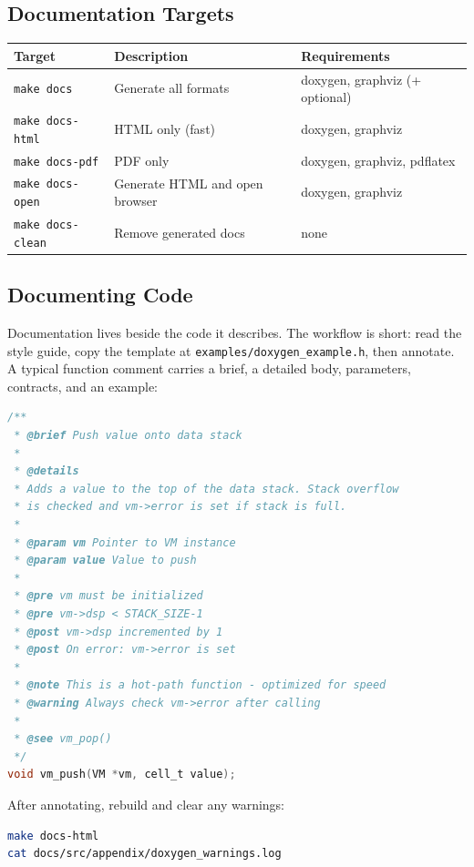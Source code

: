 \subsection{Documentation Targets}

\begin{tabular}{lll}
\toprule
Target & Description & Requirements \\
\midrule
\texttt{make docs} & Generate all formats & doxygen, graphviz (+ optional) \\
\texttt{make docs-html} & HTML only (fast) & doxygen, graphviz \\
\texttt{make docs-pdf} & PDF only & doxygen, graphviz, pdflatex \\
\texttt{make docs-open} & Generate HTML and open browser & doxygen, graphviz \\
\texttt{make docs-clean} & Remove generated docs & none \\
\bottomrule
\end{tabular}

\subsection{Documenting Code}

Documentation lives beside the code it describes. The workflow is short: read
the style guide, copy the template at \texttt{examples/doxygen\_example.h}, then
annotate. A typical function comment carries a brief, a detailed body,
parameters, contracts, and an example:

\begin{lstlisting}[language=C]
/**
 * @brief Push value onto data stack
 *
 * @details
 * Adds a value to the top of the data stack. Stack overflow
 * is checked and vm->error is set if stack is full.
 *
 * @param vm Pointer to VM instance
 * @param value Value to push
 *
 * @pre vm must be initialized
 * @pre vm->dsp < STACK_SIZE-1
 * @post vm->dsp incremented by 1
 * @post On error: vm->error is set
 *
 * @note This is a hot-path function - optimized for speed
 * @warning Always check vm->error after calling
 *
 * @see vm_pop()
 */
void vm_push(VM *vm, cell_t value);
\end{lstlisting}

After annotating, rebuild and clear any warnings:

\begin{lstlisting}[language=bash]
make docs-html
cat docs/src/appendix/doxygen_warnings.log
\end{lstlisting}

